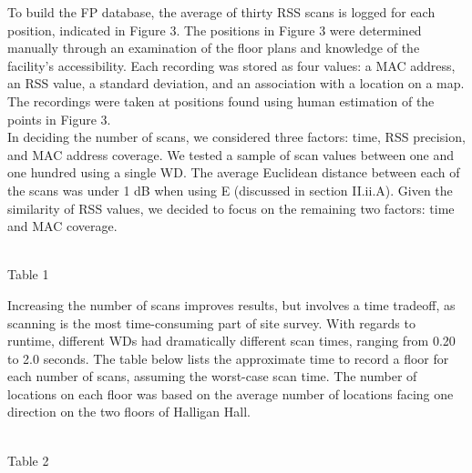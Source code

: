 \documentclass[conference]{IEEEtran}
\begin{document}
To build the FP database, the average of thirty RSS scans is logged for each position, indicated in Figure 3. The positions in Figure 3 were determined manually through an examination of the floor plans and knowledge of the facility's accessibility. Each recording was stored as four values: a MAC address, an RSS value, a standard deviation, and an association with a location on a map. The recordings were taken at positions found using human estimation of the points in Figure 3.\\
\indent In deciding the number of scans, we considered three factors: time, RSS precision, and MAC address coverage. We tested a sample of scan values between one and one hundred using a single WD. The average Euclidean distance between each of the scans was under 1 dB when using E (discussed in section II.ii.A). Given the similarity of RSS values, we decided to focus on the remaining two factors: time and MAC coverage. \\
\vspace{5mm}\\
\begin{center}
Table 1
\end{center}
\indent Increasing the number of scans improves results, but involves a time tradeoff, as scanning is the most time-consuming part of site survey. With regards to runtime, different WDs had dramatically different scan times, ranging from 0.20 to 2.0 seconds. The table below lists the approximate time to record a floor for each number of scans, assuming the worst-case scan time. The number of locations on each floor was based on the average number of locations facing one direction on the two floors of Halligan Hall.\\
\vspace{5mm}\\
\begin{center}
Table 2
\end{center}
\end{document}
